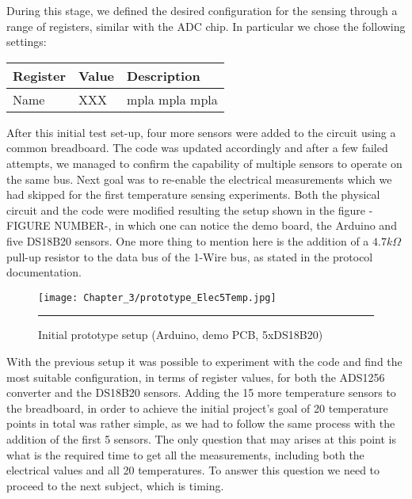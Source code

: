 During this stage, we defined the desired configuration for the sensing through a range of registers, similar with the ADC chip. In particular we chose the following settings:

\begin{center}
\begin{tabular}{ l l l } 
 Register & Value & Description \\ \hline
 Name & XXX & mpla mpla mpla
\end{tabular}
\end{center}

After this initial test set-up, four more sensors were added to the circuit using a common breadboard. The code was updated accordingly and after a few failed attempts, we managed to confirm the capability of multiple sensors to operate on the same bus. Next goal was to re-enable the electrical measurements which we had skipped for the first temperature sensing experiments. Both the physical circuit and the code were modified resulting the setup shown in the figure -FIGURE NUMBER-, in which one can notice the demo board, the Arduino and five DS18B20 sensors. One more thing to mention here is the addition of a $4.7k\Omega$ pull-up resistor to the data bus of the 1-Wire bus, as stated in the protocol documentation.\\

\begin{figure}[htbp]
	\centering
		\texttt{[image: Chapter\_3/prototype\_Elec5Temp.jpg]}
		\rule{35em}{0.5pt}
	\caption{Initial prototype setup (Arduino, demo PCB, 5xDS18B20)}
	\label{fig:Sparkfun_breakout}
\end{figure}

With the previous setup it was possible to experiment with the code and find the most suitable configuration, in terms of register values, for both the ADS1256 converter and the DS18B20 sensors. Adding the 15 more temperature sensors to the breadboard, in order to achieve the initial project's goal  of 20 temperature points in total was rather simple, as we had to follow the same process with the addition of the first 5 sensors. The only question that may arises at this point is what is the required time to get all the measurements, including both the electrical values and all 20 temperatures. To answer this question we need to proceed to the next subject, which is timing.


